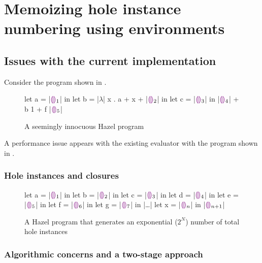 \section{Memoizing hole instance numbering using environments}
\label{sec:renumbering}

\subsection{Issues with the current implementation}
\label{sec:current_problems}

Consider the program shown in .

\begin{figure}
  \centering
  \begin{hminted}
let a = |$\hehole_1$| in
let b = |$\lambda$| x . { a + x + |$\hehole_2$| } in
let c = |$\hehole_3$| in
|$\hehole_4$| + b 1 + f |$\hehole_5$|
  \end{hminted}
  \caption{A seemingly innocuous Hazel program}
  \label{fig:sample_hazel_program}
\end{figure}

A performance issue appears with the existing evaluator with the program shown in .



\subsubsection{Hole instances and closures}
\label{sec:hole_instances_and_closures}

\begin{figure}
  \centering
  \begin{hminted}
let a = |$\hehole_1$| in
let b = |$\hehole_2$| in
let c = |$\hehole_3$| in
let d = |$\hehole_4$| in
let e = |$\hehole_5$| in
let f = |$\hehole_6$| in
let g = |$\hehole_7$| in
|\dots|
let x = |$\hehole_{n}$| in
|$\hehole_{n+1}$|
  \end{hminted}
  \caption{A Hazel program that generates an exponential ($2^N$) number of total hole instances}
  \label{fig:hole_renumbering_problem}
\end{figure}

\subsubsection{Algorithmic concerns and a two-stage approach}
\label{sec:two-stage-renumber}

